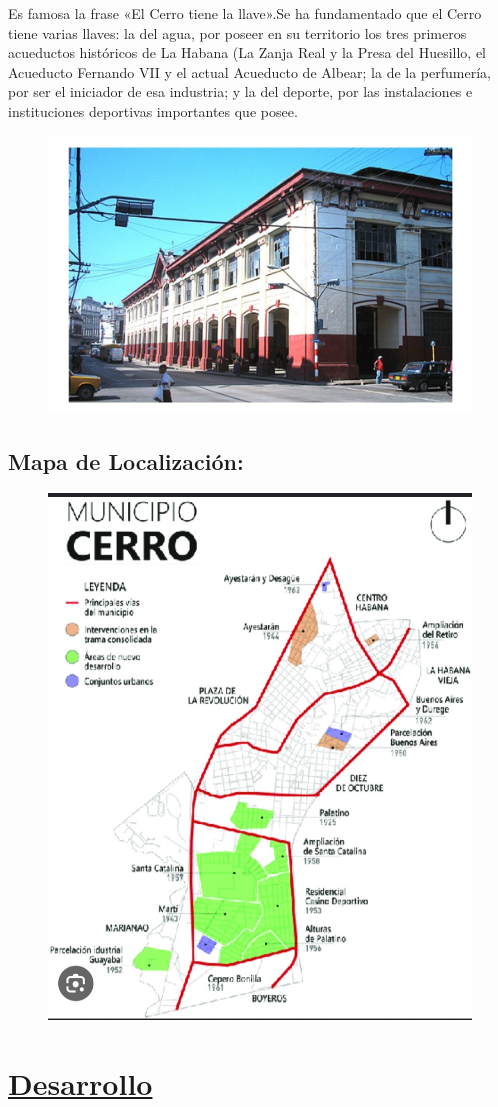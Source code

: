 \documentclass[twocolumn,12pt]{article}
\begin{document}
Es famosa la frase «El Cerro tiene la llave».Se ha fundamentado que el Cerro tiene varias llaves: la del agua, por poseer en su territorio los tres primeros acueductos históricos de La Habana (La Zanja Real y la Presa del Huesillo, el Acueducto Fernando VII y el actual Acueducto de Albear; la de la perfumería, por ser el iniciador de esa industria; y la del deporte, por las instalaciones e instituciones deportivas importantes que posee.


\begin{figure}
	\centering
	\includegraphics[width=0.7\linewidth]{cerro}
	\caption{}
	\label{fig:cerro}
\end{figure}



\subsection{Mapa de Localización:}

\begin{figure}
	\centering
	\includegraphics[width=0.4\linewidth]{mapa_cerro}
	\caption{}
	\label{fig:mapacerro}
\end{figure}




\onecolumn
\section{{\LARGE \underline{Desarrollo}}}
\end{document}
